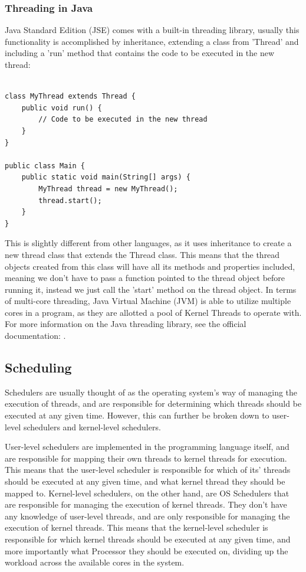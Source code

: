 \documentclass[12pt,a4paper]{article}
\begin{document}
\subsubsection{Threading in Java}

Java Standard Edition (JSE) comes with a built-in threading library\parencite{JavaThreadClass}, usually this functionality is accomplished by inheritance, extending a class from 'Thread' and including a 'run' method that contains the code to be executed in the new thread:

\begin{verbatim}

class MyThread extends Thread {
    public void run() {
        // Code to be executed in the new thread
    }
}

public class Main {
    public static void main(String[] args) {
        MyThread thread = new MyThread();
        thread.start();
    }
}
\end{verbatim}

This is slightly different from other languages, as it uses inheritance to create a new thread class that extends the Thread class. This means that the thread objects created from this class will have all its methods and properties included, meaning we don't have to pass a function pointed to the thread object before running it, instead we just call the 'start' method on the thread object. In terms of multi-core threading, Java Virtual Machine (JVM) is able to utilize multiple cores in a program, as they are allotted a pool of Kernel Threads to operate with. For more information on the Java threading library, see the official documentation: .

\subsection{Scheduling}

Schedulers are usually thought of as the operating system's way of managing the execution of threads, and are responsible for determining which threads should be executed at any given time. However, this can further be broken down to user-level schedulers and kernel-level schedulers\parencite[pp. 154-155]{Rauber2023}.

User-level schedulers are implemented in the programming language itself, and are responsible for mapping their own threads to kernel threads for execution. This means that the user-level scheduler is responsible for which of its' threads should be executed at any given time, and what kernel thread they should be mapped to. Kernel-level schedulers, on the other hand, are OS Schedulers that are responsible for managing the execution of kernel threads. They don't have any knowledge of user-level threads, and are only responsible for managing the execution of kernel threads. This means that the kernel-level scheduler is responsible for which kernel threads should be executed at any given time, and more importantly what Processor they should be executed on, dividing up the workload across the available cores in the system.
\end{document}
